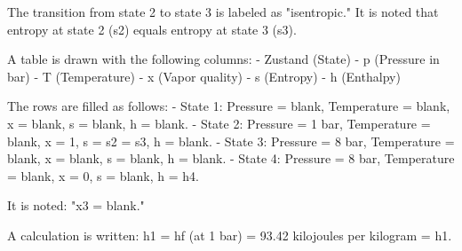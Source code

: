 The transition from state 2 to state 3 is labeled as "isentropic."  
It is noted that entropy at state 2 (s2) equals entropy at state 3 (s3).

A table is drawn with the following columns:  
- Zustand (State)  
- p (Pressure in bar)  
- T (Temperature)  
- x (Vapor quality)  
- s (Entropy)  
- h (Enthalpy)  

The rows are filled as follows:  
- State 1: Pressure = blank, Temperature = blank, x = blank, s = blank, h = blank.  
- State 2: Pressure = 1 bar, Temperature = blank, x = 1, s = s2 = s3, h = blank.  
- State 3: Pressure = 8 bar, Temperature = blank, x = blank, s = blank, h = blank.  
- State 4: Pressure = 8 bar, Temperature = blank, x = 0, s = blank, h = h4.  

It is noted:  
"x3 = blank."

A calculation is written:  
h1 = hf (at 1 bar) = 93.42 kilojoules per kilogram = h1.